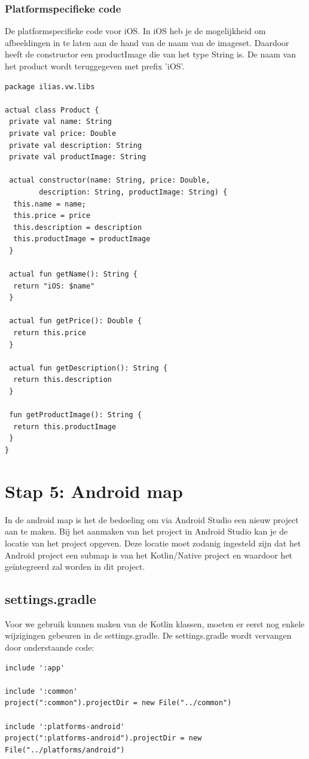 \subsubsection{Platformspecifieke code}
De platformspecifieke code voor iOS. In iOS heb je de mogelijkheid om afbeeldingen in te laten aan de hand van de naam van de imageset. Daardoor heeft de constructor een productImage die van het type String is. De naam van het product wordt teruggegeven met prefix 'iOS'.
\begin{lstlisting}
package ilias.vw.libs

actual class Product {
 private val name: String
 private val price: Double
 private val description: String
 private val productImage: String

 actual constructor(name: String, price: Double, 
		description: String, productImage: String) {
  this.name = name;
  this.price = price
  this.description = description
  this.productImage = productImage
 }

 actual fun getName(): String {
  return "iOS: $name"
 }

 actual fun getPrice(): Double {
  return this.price
 }

 actual fun getDescription(): String {
  return this.description
 }

 fun getProductImage(): String {
  return this.productImage
 }
}
\end{lstlisting}

\section{Stap 5: Android map}
In de android map is het de bedoeling om via Android Studio een nieuw project aan te maken. Bij het aanmaken van het project in Android Studio kan je de locatie van het project opgeven. Deze locatie moet zodanig ingesteld zijn dat het Android project een submap is van het Kotlin/Native project en waardoor het geïntegreerd zal worden in dit project.

\subsection{settings.gradle}
Voor we gebruik kunnen maken van de Kotlin klassen, moeten er eerst nog enkele wijzigingen gebeuren in de settings.gradle. De settings.gradle wordt vervangen door onderstaande code:

\begin{lstlisting}
include ':app'

include ':common'
project(":common").projectDir = new File("../common")

include ':platforms-android'
project(":platforms-android").projectDir = new File("../platforms/android")
\end{lstlisting}

